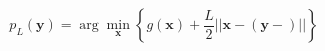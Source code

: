 \documentclass[preview,border=0.3pt]{standalone}
\begin{document}
%
\begin{equation*}
p_L(\mathbf{y}) = \arg\min_\mathbf{x}\left\{ g(\mathbf{x}) + \frac{L}{2}||\mathbf{x} - \left( \mathbf{y} -  \right)|| \right\}
\end{equation*}
\end{document}
